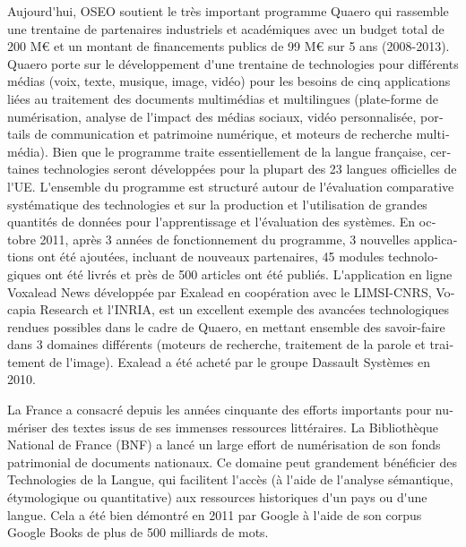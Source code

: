 \documentclass[]{../metanetpaper}
\begin{document}
\begin{french}
\begin{multicols}{2}
Aujourd{\mbox '}hui, OSEO soutient le très important programme Quaero qui
rassemble une trentaine de partenaires industriels et académiques avec
un budget total de 200 M€ et un montant de financements publics de 99
M€ sur 5 ans (2008-2013). Quaero porte sur le développement d{\mbox '}une
trentaine de technologies pour différents médias (voix, texte,
musique, image, vidéo) pour les besoins de cinq applications liées au
traitement des documents multimédias et multilingues (plate-forme de
numérisation, analyse de l{\mbox '}impact des médias sociaux, vidéo
personnalisée, portails de communication et patrimoine numérique, et
moteurs de recherche multimédia). Bien que le programme traite
essentiellement de la langue française, certaines technologies seront
développées pour la plupart des 23 langues officielles de
l{\mbox '}UE. L{\mbox '}ensemble du programme est structuré autour de l{\mbox '}évaluation
comparative systématique des technologies et sur la production et
l{\mbox '}utilisation de grandes quantités de données pour l{\mbox '}apprentissage et
l{\mbox '}évaluation des systèmes. En octobre 2011, après 3 années de
fonctionnement du programme, 3 nouvelles applications ont été
ajoutées, incluant de nouveaux partenaires, 45 modules technologiques
ont été livrés et près de 500 articles ont été publiés. L{\mbox '}application
en ligne Voxalead News développée par Exalead en coopération avec le
LIMSI-CNRS, Vocapia Research et l{\mbox '}INRIA, est un excellent exemple des
avancées technologiques rendues possibles dans le cadre de Quaero, en
mettant ensemble des savoir-faire dans 3 domaines différents (moteurs
de recherche, traitement de la parole et traitement de
l{\mbox '}image). Exalead a été acheté par le groupe Dassault Systèmes en 2010.

La France a consacré depuis les années cinquante des efforts
importants pour numériser des textes issus de ses immenses ressources
littéraires. La Bibliothèque National de France (BNF) a lancé un large
effort de numérisation de son fonds patrimonial de documents
nationaux. Ce domaine peut grandement bénéficier des Technologies de
la Langue, qui facilitent l{\mbox '}accès (à l{\mbox '}aide de l{\mbox '}analyse sémantique,
étymologique ou quantitative) aux ressources historiques d{\mbox '}un pays ou
d{\mbox '}une langue. Cela a été bien démontré en 2011 par Google à l{\mbox '}aide de
son corpus Google Books de plus de 500 milliards de mots.


\end{multicols}
\end{french}
\end{document}
